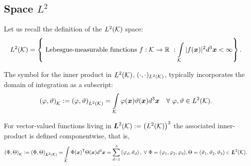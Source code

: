 \subsection{Space \texorpdfstring{$L^2$}{L2}}

Let us recall the definition of the $L^2(\mathcal{K})$ space:
% 
\begin{equation*}
    L^2(\mathcal{K})=\left\{\text{ Lebesgue-measurable functions } f:\mathcal{K}\rightarrow\mathbb{R}\ : \int\limits_{\mathcal{K}}|f(\boldsymbol{x})|^2d^3\boldsymbol{x}<\infty\right\}.
\end{equation*}

The symbol for the inner product in $L^2(\mathcal{K})$, $(\cdot,\cdot)_{L^2(\mathcal{K})}$, typically incorporates the domain of integration as a subscript:
% 
\begin{equation}
    \left(\varphi,\vartheta\right)_{\mcK}:=\left(\varphi,\vartheta\right)_{L^2(\mcK)}=\int\limits_{\mcK}\varphi(\bsx)\vartheta(\bsx)d^3\bsx\ \ \ \forall\ \varphi,\vartheta\in\Leb^2(\mcK).
\end{equation}

For vector-valued functions living in $\boldsymbol{L}^2(\mathcal{K}):=\left(L^2(\mathcal{K})\right)^3$ the associated inner-product is defined componentwise, that is,
% 
\begin{equation}
    \left(\Phi,\Theta\right)_{\mcK}:=\left(\Phi,\Theta\right)_{\bLeb^2(\mcK)}=\int\limits_{\mcK}\Phi(\bsx)^\T\Theta(\bsx)d^3\bsx=\sum\limits_{d=1}^{3}\left(\varphi_d,\vartheta_d\right),\;\forall\ \Phi=(\varphi_1,\varphi_2,\varphi_3),\Theta=(\vartheta_1,\vartheta_2,\vartheta_3)\in\bLeb^2(\mcK).
\end{equation}

